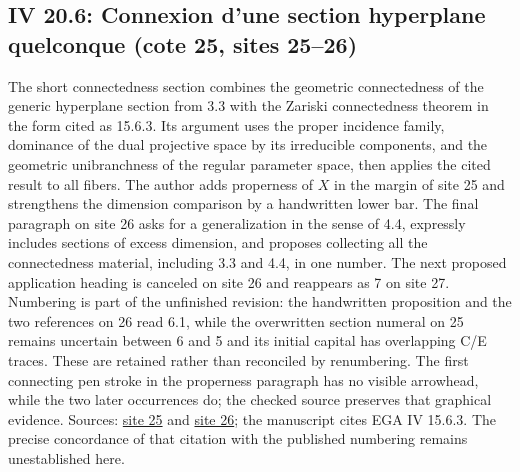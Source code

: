 \subsection*{IV 20.6: Connexion d'une section hyperplane quelconque (cote 25, sites 25--26)}
The short connectedness section combines the geometric connectedness of the generic hyperplane section from 3.3 with the Zariski connectedness theorem in the form cited as 15.6.3. Its argument uses the proper incidence family, dominance of the dual projective space by its irreducible components, and the geometric unibranchness of the regular parameter space, then applies the cited result to all fibers. The author adds properness of $X$ in the margin of site 25 and strengthens the dimension comparison by a handwritten lower bar. The final paragraph on site 26 asks for a generalization in the sense of 4.4, expressly includes sections of excess dimension, and proposes collecting all the connectedness material, including 3.3 and 4.4, in one number. The next proposed application heading is canceled on site 26 and reappears as 7 on site 27. Numbering is part of the unfinished revision: the handwritten proposition and the two references on 26 read 6.1, while the overwritten section numeral on 25 remains uncertain between 6 and 5 and its initial capital has overlapping C/E traces. These are retained rather than reconciled by renumbering. The first connecting pen stroke in the properness paragraph has no visible arrowhead, while the two later occurrences do; the checked source preserves that graphical evidence. Sources: \href{https://grothendieck.umontpellier.fr/web/viewer.html?file=../25.pdf\#page=26}{site 25} and \href{https://grothendieck.umontpellier.fr/web/viewer.html?file=../25.pdf\#page=27}{site 26}; the manuscript cites EGA IV 15.6.3. The precise concordance of that citation with the published numbering remains unestablished here.
